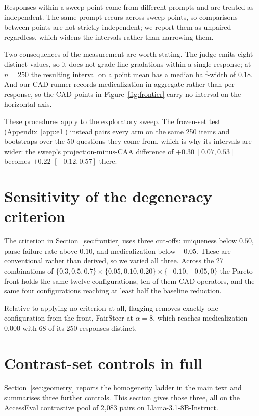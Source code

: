 Responses within a sweep point come from different prompts and are treated as
independent. The same prompt recurs across sweep points, so comparisons between points
are not strictly independent; we report them as unpaired regardless, which widens the
intervals rather than narrowing them.

Two consequences of the measurement are worth stating. The judge emits eight distinct
values, so it does not grade fine gradations within a single response; at $n{=}250$ the
resulting interval on a point mean has a median half-width of $0.18$. And our CAD runner
records medicalization in aggregate rather than per response, so the CAD points in
Figure~\ref{fig:frontier} carry no interval on the horizontal axis.

These procedures apply to the exploratory sweep. The frozen-set test
(Appendix~\ref{app:e1}) instead pairs every arm on the same 250 items and bootstraps over
the 50 questions they come from, which is why its intervals are wider: the sweep's
projection-minus-CAA difference of $+0.30$ $[0.07, 0.53]$ becomes $+0.22$
$[-0.12, 0.57]$ there.

\section{Sensitivity of the degeneracy criterion}
\label{app:thresholds}

The criterion in Section~\ref{sec:frontier} uses three cut-offs: uniqueness below
$0.50$, parse-failure rate above $0.10$, and medicalization below $-0.05$. These are
conventional rather than derived, so we varied all three. Across the 27 combinations of
$\{0.3, 0.5, 0.7\} \times \{0.05, 0.10, 0.20\} \times \{-0.10, -0.05, 0\}$ the Pareto
front holds the same twelve configurations, ten of them CAD operators, and the same four
configurations reaching at least half the baseline reduction.

Relative to applying no criterion at all, flagging removes exactly one configuration
from the front, FairSteer at $\alpha{=}8$, which reaches medicalization $0.000$ with 68
of its 250 responses distinct.

\section{Contrast-set controls in full}
\label{app:controls}

Section~\ref{sec:geometry} reports the homogeneity ladder in the main text and summarises
three further controls. This section gives those three, all on the AccessEval contrastive
pool of 2{,}083 pairs on Llama-3.1-8B-Instruct.


